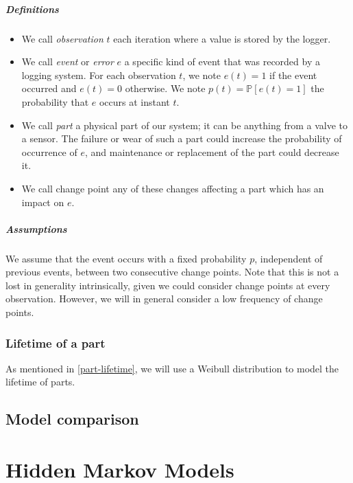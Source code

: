 \documentclass{kththesis}
\def\P{{\mathbb{P}}}
\begin{document}
\paragraph{Definitions}

\begin{itemize}
\item We call \emph{observation} $t$ each iteration where a value is stored by the logger.

\item We call \emph{event} or \emph{error} $e$ a specific kind of event that was recorded by a logging system. For each observation $t$, we note $e(t)=1$ if the event occurred and $e(t)=0$ otherwise. We note $p(t)=\P[e(t)=1]$ the probability that $e$ occurs at instant $t$.

\item We call \emph{part} a physical part of our system; it can be anything from a valve to a sensor. The failure or wear of such a part could increase the probability of occurrence of $e$, and maintenance or replacement of the part could decrease it.

\item We call change point any of these changes affecting a part which has an impact on $e$.
\end{itemize}

\paragraph{Assumptions}

We assume that the event occurs with a fixed probability $p$, independent of previous events, between two consecutive change points. 
Note that this is not a lost in generality intrinsically, given we could consider change points at every observation. However, we will in general consider a low frequency of change points.


\subsection{Lifetime of a part}

As mentioned in \ref{part-lifetime}, we will use a Weibull distribution to model the lifetime of parts. 

\section{Model comparison}


\chapter{Hidden Markov Models}
\end{document}
